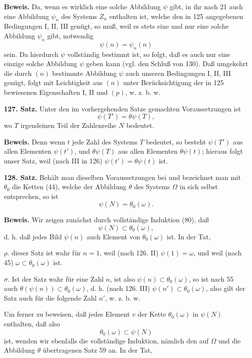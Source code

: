 \documentclass[11pt]{article}
\newcommand{\partof}{\mathrel{\subset}}
\begin{document}
\noindent\textbf{Beweis.} Da, wenn es wirklich eine solche Abbildung $\psi$ gibt, in ihr nach 21 auch eine Abbildung $\psi_n$ des Systems $Z_n$ enthalten ist, welche den in 125 angegebenen Bedingungen I, II, III genügt, so muß, weil es stets eine und nur eine solche Abbildung $\psi_n$ gibt, notwendig
\[
\psi(n)=\psi_n(n) \tag{n}
\]
sein. Da hierdurch $\psi$ vollständig bestimmt ist, so folgt, daß es auch nur eine einzige solche Abbildung $\psi$ geben kann (vgl. den Schluß von 130). Daß umgekehrt die durch $(n)$ bestimmte Abbildung $\psi$ auch unseren Bedingungen I, II, III genügt, folgt mit Leichtigkeit aus $(n)$ unter Berücksichtigung der in 125 bewiesenen Eigenschaften I, II und $(p)$, w. z. b. w.

\noindent\textbf{127. Satz.} Unter den im vorhergehenden Satze gemachten Voraussetzungen ist
\[
\psi(T')=\theta\psi(T),
\]
wo $T$ irgendeinen Teil der Zahlenreihe $N$ bedeutet.

\noindent\textbf{Beweis.} Denn wenn $t$ jede Zahl des Systems $T$ bedeutet, so besteht $\psi(T')$ aus allen Elementen $\psi(t')$, und $\theta\psi(T)$ aus allen Elementen $\theta\psi(t)$; hieraus folgt unser Satz, weil (nach III in 126) $\psi(t')=\theta\psi(t)$ ist.

\noindent\textbf{128. Satz.} Behält man dieselben Voraussetzungen bei und bezeichnet man mit $\theta_0$ die Ketten (44), welche der Abbildung $\theta$ des Systems $\Omega$ in sich selbst entsprechen, so ist
\[
\psi(N)=\theta_0(\omega).
\]

\noindent\textbf{Beweis.} Wir zeigen zunächst durch vollständige Induktion (80), daß
\[
\psi(N)\partof\theta_0(\omega),
\]
d. h. daß jedes Bild $\psi(n)$ auch Element von $\theta_0(\omega)$ ist. In der Tat,

\noindent $\rho.$ dieser Satz ist wahr für $n=1$, weil (nach 126. II) $\psi(1)=\omega$, und weil (nach 45) $\omega\partof\theta_0(\omega)$ ist.

\noindent $\sigma.$ Ist der Satz wahr für eine Zahl $n$, ist also $\psi(n)\partof\theta_0(\omega)$, so ist nach 55 auch $\theta(\psi(n))\partof\theta_0(\omega)$, d. h. (nach 126. III) $\psi(n')\partof\theta_0(\omega)$, also gilt der Satz auch für die folgende Zahl $n'$, w. z. b. w.

Um ferner zu beweisen, daß jedes Element $v$ der Kette $\theta_0(\omega)$ in $\psi(N)$ enthalten, daß also
\[
\theta_0(\omega)\partof\psi(N)
\]
ist, wenden wir ebenfalls die vollständige Induktion, nämlich den auf $\Omega$ und die Abbildung $\theta$ übertragenen Satz 59 an. In der Tat,
\end{document}
